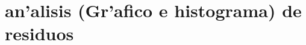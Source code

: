 \documentclass[a4paper]{report}
\begin{document}
%
%
%

\section{an'alisis (Gr'afico e histograma) de residuos}
\end{document}
